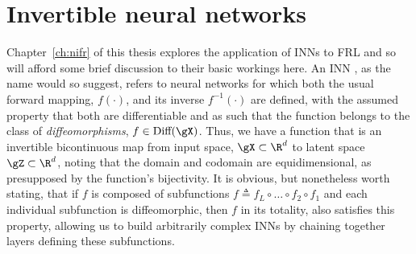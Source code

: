 \section{Invertible neural networks}\label{sec:inns}
Chapter~\ref{ch:nifr} of this thesis explores the application of \acp{INN} to \ac{FRL} and so will
afford some brief discussion to their basic workings here.
%
%
An \acl{INN} \citep{kobyzev2020normalizing}, as the name would so suggest, refers to neural
networks for which both the usual forward mapping, \(f(\cdot)\), and its inverse \(f^{-1}(\cdot)\) are
defined, with the assumed property that both are differentiable and as such that the function
belongs to the class of \emph{diffeomorphisms}, \(f \in \text{Diff}(\gX)\). 
%
Thus, we have a function that is an invertible bicontinuous map from input space, \(\gX \subset
\R^d \) to latent space \(\gZ \subset \R^d \), noting that the domain and codomain are
equidimensional, as presupposed by the function's bijectivity.
%
It is obvious, but nonetheless worth stating, that if \(f\) is composed of subfunctions \(f
\triangleq f_L \circ \dots \circ f_2 \circ f_1\) and each individual subfunction is diffeomorphic,
then \(f\) in its totality, also satisfies this property, allowing us to build arbitrarily complex
\acp{INN} by chaining together layers defining these subfunctions.
%

